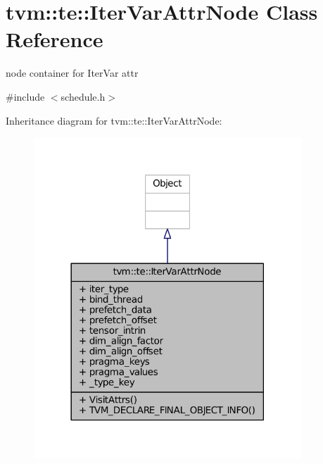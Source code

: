 \hypertarget{classtvm_1_1te_1_1IterVarAttrNode}{}\section{tvm\+:\+:te\+:\+:Iter\+Var\+Attr\+Node Class Reference}
\label{classtvm_1_1te_1_1IterVarAttrNode}


node container for Iter\+Var attr  




{\ttfamily \#include $<$schedule.\+h$>$}



Inheritance diagram for tvm\+:\+:te\+:\+:Iter\+Var\+Attr\+Node\+:
\nopagebreak
\begin{figure}[H]
\begin{center}
\leavevmode
\includegraphics[width=285pt]{classtvm_1_1te_1_1IterVarAttrNode__inherit__graph}
\end{center}
\end{figure}


